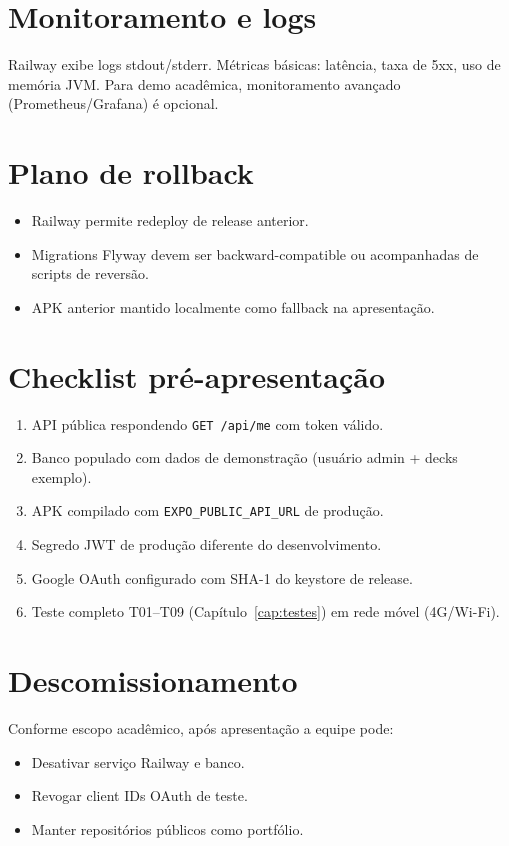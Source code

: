\section{Monitoramento e logs}

Railway exibe logs stdout/stderr. Métricas básicas: latência, taxa de 5xx, uso de memória JVM. Para demo acadêmica, monitoramento avançado (Prometheus/Grafana) é opcional.

\section{Plano de rollback}

\begin{itemize}
    \item Railway permite redeploy de release anterior.
    \item Migrations Flyway devem ser backward-compatible ou acompanhadas de scripts de reversão.
    \item APK anterior mantido localmente como fallback na apresentação.
\end{itemize}

\section{Checklist pré-apresentação}

\begin{enumerate}
    \item API pública respondendo \texttt{GET /api/me} com token válido.
    \item Banco populado com dados de demonstração (usuário admin + decks exemplo).
    \item APK compilado com \texttt{EXPO\_PUBLIC\_API\_URL} de produção.
    \item Segredo JWT de produção diferente do desenvolvimento.
    \item Google OAuth configurado com SHA-1 do keystore de release.
    \item Teste completo T01--T09 (Capítulo~\ref{cap:testes}) em rede móvel (4G/Wi-Fi).
\end{enumerate}

\section{Descomissionamento}

Conforme escopo acadêmico, após apresentação a equipe pode:
\begin{itemize}
    \item Desativar serviço Railway e banco.
    \item Revogar client IDs OAuth de teste.
    \item Manter repositórios públicos como portfólio.
\end{itemize}


